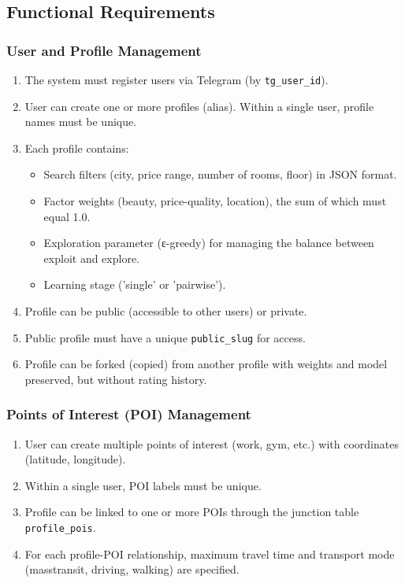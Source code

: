 \documentclass[12pt,a4paper]{article}
\begin{document}
\subsection{Functional Requirements}

\subsubsection{User and Profile Management}
\begin{enumerate}
    \item The system must register users via Telegram (by \texttt{tg\_user\_id}).
    \item User can create one or more profiles (alias). Within a single user, profile names must be unique.
    \item Each profile contains:
    \begin{itemize}
        \item Search filters (city, price range, number of rooms, floor) in JSON format.
        \item Factor weights (beauty, price-quality, location), the sum of which must equal 1.0.
        \item Exploration parameter (ε-greedy) for managing the balance between exploit and explore.
        \item Learning stage ('single' or 'pairwise').
    \end{itemize}
    \item Profile can be public (accessible to other users) or private.
    \item Public profile must have a unique \texttt{public\_slug} for access.
    \item Profile can be forked (copied) from another profile with weights and model preserved, but without rating history.
\end{enumerate}

\subsubsection{Points of Interest (POI) Management}
\begin{enumerate}
    \item User can create multiple points of interest (work, gym, etc.) with coordinates (latitude, longitude).
    \item Within a single user, POI labels must be unique.
    \item Profile can be linked to one or more POIs through the junction table \texttt{profile\_pois}.
    \item For each profile-POI relationship, maximum travel time and transport mode (masstransit, driving, walking) are specified.
\end{enumerate}
\end{document}
